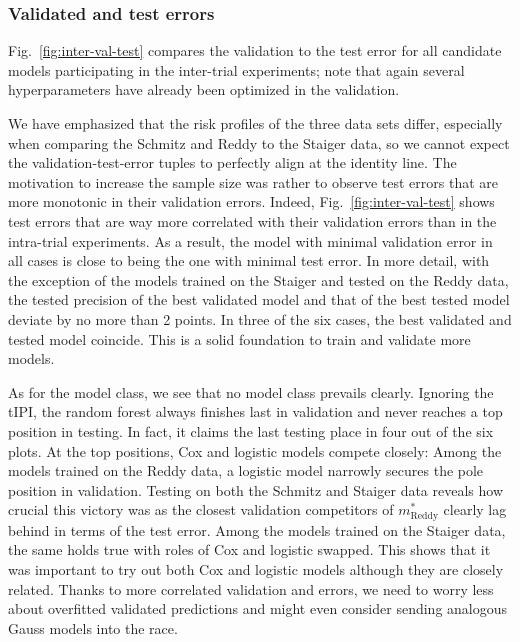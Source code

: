 \subsubsection{Validated and test errors}



Fig.\ \ref{fig:inter-val-test} compares the validation to the test error for all candidate models 
participating in the inter-trial experiments; note that again several hyperparameters have already 
been optimized in the validation. 

We have emphasized that the risk profiles of the three data sets differ, especially when comparing 
the Schmitz and Reddy to the Staiger data, so we cannot expect the validation-test-error tuples 
to perfectly align at the identity line. The motivation to increase the sample size was rather 
to observe test errors that are more monotonic in their validation errors. Indeed, Fig.\ 
\ref{fig:inter-val-test} shows test errors that are way more correlated with their validation errors 
than in the intra-trial experiments. As a result, the model with minimal validation error in all 
cases is close to being the one with minimal test error. In more detail, with the exception of 
the models trained on the Staiger and tested on the Reddy data, the tested precision of the best 
validated model and that of the best tested model deviate by no more than \num{2} points. In 
three of the six cases, the best validated and tested model coincide. This is a solid foundation 
to train and validate more models.

As for the model class, we see that no model class prevails clearly. Ignoring the tIPI, the random 
forest always finishes last in validation and never reaches a top position in testing. In fact, 
it claims the last testing place in four out of the six plots. At the top positions, Cox and 
logistic models compete closely: Among the models trained on the Reddy data, a logistic model 
narrowly secures the pole position in validation. Testing on both the Schmitz and Staiger 
data reveals how crucial this victory was as the closest validation competitors of 
$m^*_\text{Reddy}$ clearly lag behind in terms of the test error. Among the models trained on the 
Staiger data, the same holds true with roles of Cox and logistic swapped. This shows that it 
was important to try out both Cox and logistic models although they are closely related. Thanks to 
more correlated validation and errors, we need to worry less about overfitted validated 
predictions and might even consider sending analogous Gauss models into the race.

